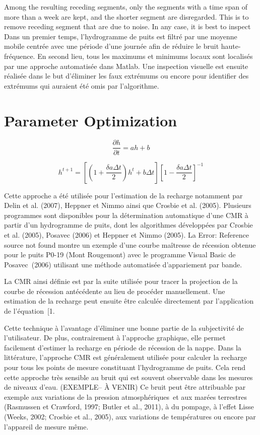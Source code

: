 \documentclass[WHATMANUAL.tex]{subfiles}
\begin{document}

Among the resulting receding segments, only the segments with a time span of more than a week are kept, and the shorter segment are disregarded. This is to remove receding segment that are due to noise.  In any case, it is best to inspect 
Dans un premier temps, l'hydrogramme de puits est filtré par une moyenne mobile centrée avec une période d'une journée afin de réduire le bruit haute-fréquence. En second lieu, tous les maximums et minimums locaux sont localisés par une approche automatisée dans Matlab. Une inspection visuelle est ensuite réalisée dans le but d'éliminer les faux extrémums ou encore pour identifier des extrémums qui auraient été omis par l'algorithme.

\section{Parameter Optimization}

\begin{equation}
   \frac{\partial h}{\partial t} = ah + b
\end{equation}

\begin{equation}
   h^{t+1} = \left[\left(1 + \frac{\delta a \Delta t}{2}\right)h^t + b \Delta t\right]\left[1 - \frac{\delta a \Delta t}{2}\right]^{-1}
\end{equation}

Cette approche a été utilisée pour l'estimation de la recharge notamment par Delin et al. (2007), Heppner et Nimmo ainsi que Crosbie et al. (2005). Plusieurs programmes sont disponibles pour la détermination automatique d'une CMR à partir d'un hydrogramme de puits, dont les algorithmes développées par Crosbie et al. (2005), Posavec (2006) et Heppner et Nimmo (2005). 
La Error: Reference source not found montre un exemple d'une courbe maîtresse de récession obtenue pour le puits P0-19 (Mont Rougemont) avec le programme Visual Basic de Posavec (2006) utilisant une méthode automatisée d'appariement par bande.

La CMR ainsi définie est par la suite utilisée pour tracer la projection de la courbe de récession antécédente au lieu de procéder manuellement. Une estimation de la recharge peut ensuite être calculée directement par l'application de l'équation [1.

Cette technique à l'avantage d'éliminer une bonne partie de la subjectivité de l'utilisateur. De plus, contrairement à l'approche graphique, elle permet facilement d'estimer la recharge en période de récession de la nappe. Dans la littérature, l'approche CMR est généralement utilisée pour calculer la recharge pour tous les points de mesure constituant l'hydrogramme de puits. Cela rend cette approche très sensible au bruit qui est souvent observable dans les mesures de niveaux d'eau. (EXEMPLE– À VENIR) Ce bruit peut être attribuable par exemple aux variations de la pression atmosphériques et aux marées terrestres (Rasmussen et Crawford, 1997; Butler et al., 2011), à du pompage, à l'effet Lisse (Weeks, 2002; Crosbie et al., 2005), aux variations de températures ou encore par l'appareil de mesure même.
\end{document}
